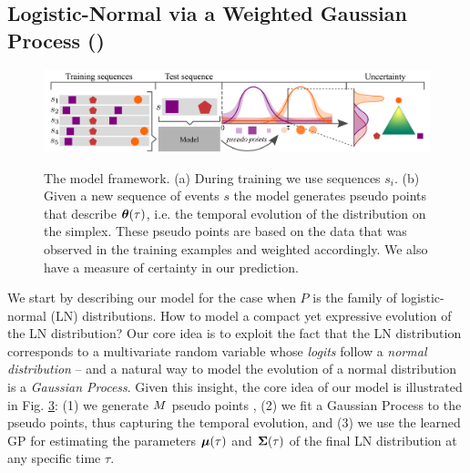 \subsection{Logistic-Normal via a Weighted Gaussian Process (\GPModel)}
\label{GP}

\begin{figure}
	\centering
	\includegraphics[width=\linewidth]{images/model_schema.pdf}
	\begin{subfigure}{0.3\textwidth}
		\caption{} \label{fig:model_illustration_1}
	\end{subfigure}
	\begin{subfigure}{0.69\textwidth}
		\caption{} \label{fig:model_illustration_2}
	\end{subfigure}
	\vspace*{-0.5cm}
    \caption{The model framework. (a) During training we use sequences $s_i$. (b) Given a new sequence of events $s$ the model generates pseudo points that describe $\bm{\theta}(\tau)$, i.e. the temporal evolution of the distribution on the simplex. These pseudo points are based on the data that was observed in the training examples and weighted accordingly. We also have a measure of certainty in our prediction.}\label{fig:model_illustration}
    \vspace*{-0.5cm}
\end{figure}

We start by describing our model for the case when $P$ is the family of logistic-normal (LN) distributions.
How to model a compact yet expressive evolution of the LN distribution?
Our core idea is to exploit the fact that the LN distribution corresponds to a multivariate random variable whose \textit{logits} follow a \textit{normal distribution} -- and a natural way to model the evolution of a normal distribution is a \textit{Gaussian Process}. Given this insight, the core idea of our model is illustrated in Fig. \ref{fig:model_illustration}: (1) we generate $M$ pseudo points , (2) we fit a Gaussian Process to the pseudo points, thus capturing the temporal evolution, and (3) we use the learned GP for estimating the parameters $\bm \mu(\tau)$ and $\bm \Sigma(\tau)$ of the final LN distribution at any specific time $\tau$. 

